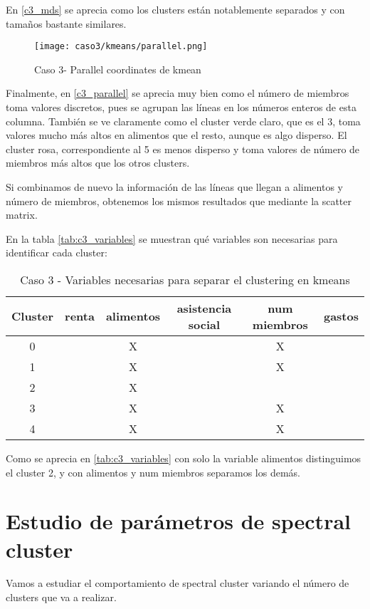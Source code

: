 En \eqref{c3_mds} se aprecia como los clusters están notablemente separados y con tamaños bastante similares.

\begin{figure}[H]
\caption{Caso 3- Parallel coordinates de kmean}
\label{c3_parallel}
\texttt{[image: caso3/kmeans/parallel.png]}
\end{figure}

Finalmente, en \eqref{c3_parallel} se aprecia muy bien como el número de miembros toma valores discretos, pues se agrupan las líneas en los números enteros de esta columna. También se ve claramente como el cluster verde claro, que es el 3, toma valores mucho más altos en alimentos que el resto, aunque es algo disperso. El cluster rosa, correspondiente al 5 es menos disperso y toma valores de número de miembros más altos que los otros clusters.

Si combinamos de nuevo la información de las líneas que llegan a alimentos y número de miembros, obtenemos los mismos resultados que mediante la scatter matrix.



En la tabla  \eqref{tab:c3_variables} se muestran qué variables son necesarias para identificar cada cluster:

\begin{table}[H]
\centering
\caption{Caso 3 - Variables necesarias para separar el clustering en kmeans}
\label{tab:c3_variables}
\begin{tabular}{cccccc}
\toprule
 Cluster & renta & alimentos & asistencia social & num miembros & gastos \\
\midrule
0 & & X & & X & \\
1 & & X & & X & \\
2 & & X & & & \\
3 & & X & & X & \\
4 & & X & & X & \\
\bottomrule
\end{tabular}
\end{table}
Como se aprecia en \eqref{tab:c3_variables} con solo la variable alimentos distinguimos el cluster 2, y con alimentos y num miembros separamos los demás.

\section{Estudio de parámetros de spectral cluster}

Vamos a estudiar el comportamiento de spectral cluster variando el número de clusters que va a realizar.

